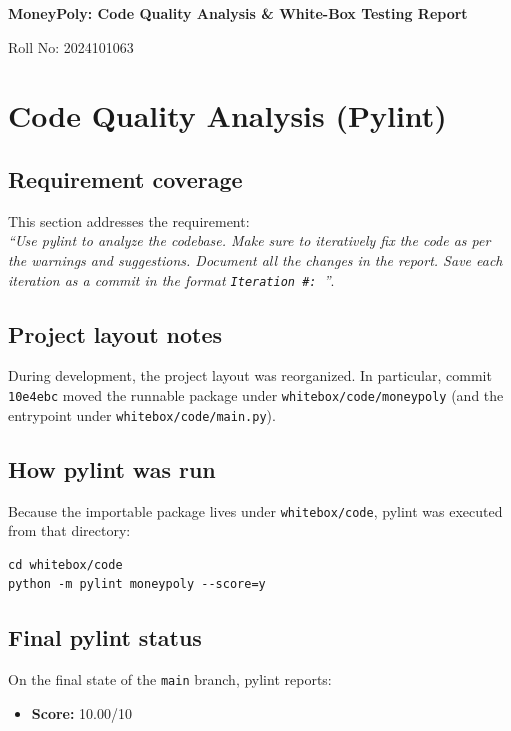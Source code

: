 \documentclass[11pt,a4paper]{article}
\begin{document}
\begin{center}
{\LARGE\bfseries MoneyPoly: Code Quality Analysis \& White-Box Testing Report\par}
\vspace{0.25em}
{\large Roll No: 2024101063\par}
\end{center}
\vspace{0.5em}

\section{Code Quality Analysis (Pylint)}
\label{sec:pylint}

\subsection{Requirement coverage}
This section addresses the requirement:\\
\textit{``Use pylint to analyze the codebase. Make sure to iteratively fix the code as per the warnings and suggestions. Document all the changes in the report. Save each iteration as a commit in the format \texttt{Iteration \#:\ <What You Changed>}''}.

\subsection{Project layout notes}
During development, the project layout was reorganized. In particular, commit \texttt{10e4ebc} moved the runnable package under \texttt{whitebox/code/moneypoly} (and the entrypoint under \texttt{whitebox/code/main.py}).

\subsection{How pylint was run}
Because the importable package lives under \texttt{whitebox/code}, pylint was executed from that directory:

\begin{verbatim}
cd whitebox/code
python -m pylint moneypoly --score=y
\end{verbatim}

\subsection{Final pylint status}
On the final state of the \texttt{main} branch, pylint reports:
\begin{itemize}[leftmargin=*]
  \item \textbf{Score:} 10.00/10
\end{itemize}
\end{document}
